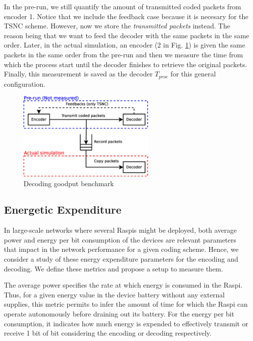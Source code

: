 In the pre-run, we still quantify the amount of transmitted coded
packets from encoder 1. Notice that we include the feedback case because
it is necesary for the \ac{TSNC} scheme. However, now we store
the \textit{transmitted packets} instead. The reason being
that we want to feed the decoder with the same packets in the same
order. Later, in the actual simulation, an encoder (2 in Fig.
\ref{fig:dec_goodput_benchmark}) is given the same packets in the same
order from the pre-run and then we measure the time from which the
process start until the decoder finishes to retrieve the original
packets. Finally, this measurement is saved as the decoder $T_{proc}$
for this general configuration.

\begin{figure}[ht!]
\centering
\includegraphics[width=0.6\textwidth]{images/measure_decoder.eps}
\caption{Decoding goodput benchmark}
\label{fig:dec_goodput_benchmark}
\end{figure}

\subsection{Energetic Expenditure}
\label{sec:energy_metrics_methods}
In large-scale networks where several \ac{Raspi}s might be deployed,
both average power and energy per bit consumption of the devices are
relevant parameters that impact in the network performance for a given
coding scheme. Hence, we consider a study of these energy expenditure
parameters for the encoding and decoding. We define these metrics
and propose a setup to measure them.

The average power specifies the rate at which energy is
consumed in the \ac{Raspi}. Thus, for a given energy value in the device
battery without any external supplies, this metric permits to infer the amount
of time for which the \ac{Raspi} can operate autonomously before draining
out its battery. For the energy per bit consumption, it indicates how
much energy is expended to effectively transmit or receive 1 bit of bit
considering the encoding or decoding respectively.

